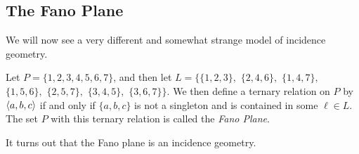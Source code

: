 \subsection{The Fano Plane}

We will now see a very different and somewhat strange model of incidence geometry.

\begin{dfn}
Let \(P = \{1,2,3,4,5,6,7\}\), and then let \(L = \{\{1,2,3\},\) \(\{2,4,6\},\) \(\{1,4,7\},\) \(\{1,5,6\},\) \(\{2,5,7\},\) \(\{3,4,5\},\) \(\{3,6,7\}\}\).
We then define a ternary relation on \(P\) by \(\langle a, b, c \rangle\) if and only if \(\{a,b,c\}\) is not a singleton and is contained in some \(\ell \in L\).
The set \(P\) with this ternary relation is called the \emph{Fano Plane}.
\end{dfn}

It turns out that the Fano plane is an incidence geometry.
